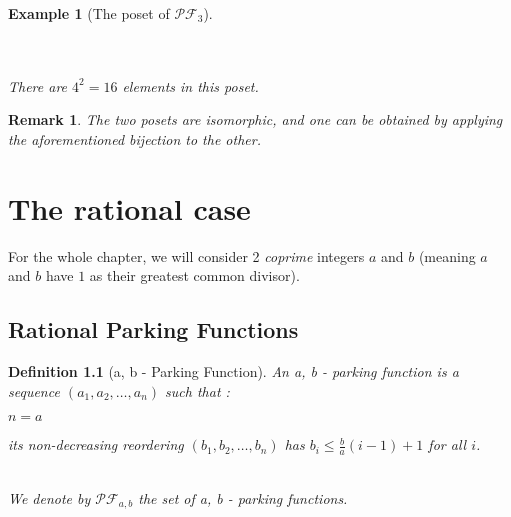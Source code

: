\documentclass[12pt]{report}
\newtheorem{definition}{Definition}
\newtheorem*{example}{Example}
\newtheorem*{rem}{Remark}
\begin{document}
\begin{example}[The poset of $\mathcal{PF}_3$]
\begin{center}
        ~\\
        ~\\
        There are $4^2 = 16$ elements in this poset.
    \end{center}
\end{example}

\begin{rem}
    The two posets are isomorphic, and one can be obtained by
    applying the aforementioned bijection to the other.
\end{rem}

\chapter{The rational case}

For the whole chapter, we will consider 2 \emph{coprime}
integers $a$ and $b$ (meaning $a$ and $b$ have $1$ as their
greatest common divisor).

\section{Rational Parking Functions}

\begin{definition}[a, b - Parking Function]
    An \emph{a, b - parking function} is a sequence 
    $(a_1, a_2, \ldots, a_n)$ such that :\\
    \begin{itemize*}
        \item $n = a$\\
        \item its non-decreasing reordering 
        $(b_1, b_2, \ldots, b_n)$
        has $b_i \leqslant \frac{b}{a}(i-1) + 1$
        for all $i$.\\\\
    \end{itemize*}
    We denote by $\mathcal{PF}_{a,b}$ the set of 
    a, b - parking functions.
\end{definition}
\end{document}
